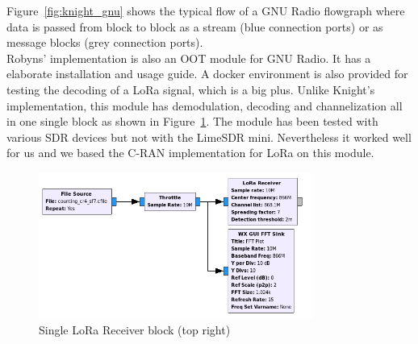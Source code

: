 Figure~\ref{fig:knight_gnu} shows the typical flow of a GNU Radio flowgraph where data is passed 
from block to block as a stream (blue connection ports) or as message blocks (grey connection ports).
\\
Robyns' implementation is also an OOT module for GNU Radio. It has a elaborate 
installation and usage guide. A docker environment is also provided for testing the 
decoding of a LoRa signal, which is a big plus. Unlike Knight's implementation, this module
has demodulation, decoding and channelization all in one single block as shown in Figure~\ref{fig:robyns_gnu}. 
The module has been tested with various SDR devices but not with the LimeSDR mini. Nevertheless it worked
well for us and we based the C-RAN implementation for LoRa on this module.

\begin{figure}[h]
    \centering
    \includegraphics[width=0.8\textwidth]{figures/robyns_gnu.png}
    \caption{Single LoRa Receiver block (top right)~\cite{robyns_implementation}}
    \label{fig:robyns_gnu}
\end{figure}

